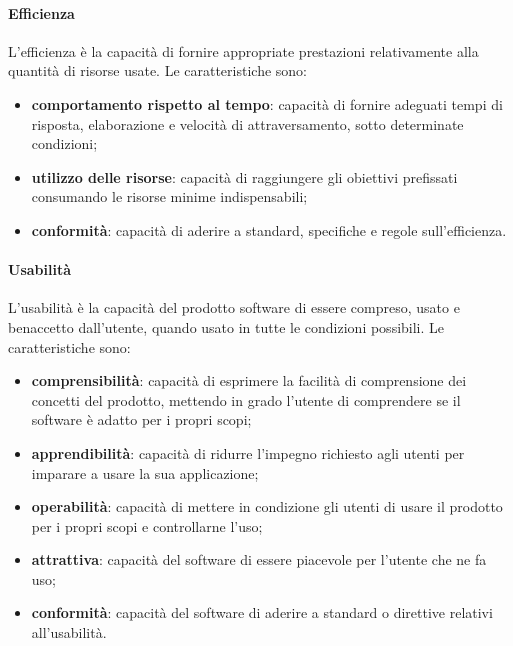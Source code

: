 \paragraph{Efficienza}
L'efficienza è la capacità di fornire appropriate prestazioni relativamente alla quantità di risorse usate. Le caratteristiche sono:
\begin{itemize}
\item \textbf{comportamento rispetto al tempo}: capacità di fornire adeguati tempi di risposta, elaborazione e velocità di attraversamento, sotto determinate condizioni;
\item \textbf{utilizzo delle risorse}: capacità di raggiungere gli obiettivi prefissati consumando le risorse minime indispensabili;
\item \textbf{conformità}: capacità di aderire a standard, specifiche e regole sull'efficienza.
\end{itemize}

\paragraph{Usabilità}
L'usabilità è la capacità del prodotto software di essere compreso, usato e benaccetto dall'utente, quando usato in tutte le condizioni possibili. Le caratteristiche sono:
\begin{itemize}
\item \textbf{comprensibilità}: capacità di esprimere la facilità di comprensione dei concetti del prodotto, mettendo in grado l'utente di comprendere se il software è adatto per i propri scopi;
\item \textbf{apprendibilità}: capacità di ridurre l'impegno richiesto agli utenti per imparare a usare la sua applicazione;
\item \textbf{operabilità}: capacità di mettere in condizione gli utenti di usare il prodotto per i propri scopi e controllarne l'uso;
\item \textbf{attrattiva}: capacità del software di essere piacevole per l'utente che ne fa uso;
\item \textbf{conformità}: capacità del software di aderire a standard o direttive relativi all'usabilità.
\end{itemize}

